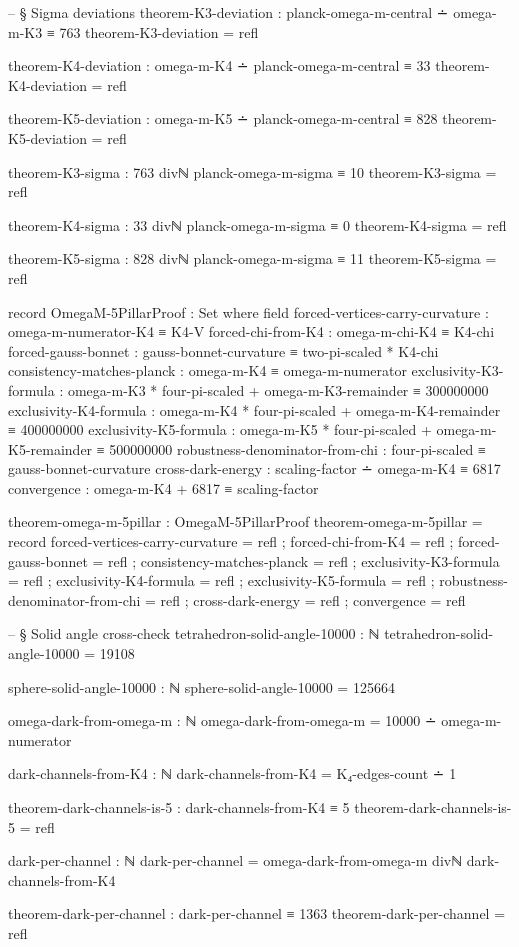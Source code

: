\documentclass[11pt,a4paper]{book}
\begin{document}
\begin{code}
-- § Sigma deviations
theorem-K3-deviation : planck-omega-m-central ∸ omega-m-K3 ≡ 763
theorem-K3-deviation = refl

theorem-K4-deviation : omega-m-K4 ∸ planck-omega-m-central ≡ 33
theorem-K4-deviation = refl

theorem-K5-deviation : omega-m-K5 ∸ planck-omega-m-central ≡ 828
theorem-K5-deviation = refl

theorem-K3-sigma : 763 divℕ planck-omega-m-sigma ≡ 10
theorem-K3-sigma = refl

theorem-K4-sigma : 33 divℕ planck-omega-m-sigma ≡ 0
theorem-K4-sigma = refl

theorem-K5-sigma : 828 divℕ planck-omega-m-sigma ≡ 11
theorem-K5-sigma = refl

record OmegaM-5PillarProof : Set where
  field
    forced-vertices-carry-curvature : omega-m-numerator-K4 ≡ K4-V
    forced-chi-from-K4 : omega-m-chi-K4 ≡ K4-chi
    forced-gauss-bonnet : gauss-bonnet-curvature ≡ two-pi-scaled * K4-chi
    consistency-matches-planck : omega-m-K4 ≡ omega-m-numerator
    exclusivity-K3-formula : omega-m-K3 * four-pi-scaled + omega-m-K3-remainder ≡ 300000000
    exclusivity-K4-formula : omega-m-K4 * four-pi-scaled + omega-m-K4-remainder ≡ 400000000
    exclusivity-K5-formula : omega-m-K5 * four-pi-scaled + omega-m-K5-remainder ≡ 500000000
    robustness-denominator-from-chi : four-pi-scaled ≡ gauss-bonnet-curvature
    cross-dark-energy : scaling-factor ∸ omega-m-K4 ≡ 6817
    convergence : omega-m-K4 + 6817 ≡ scaling-factor

theorem-omega-m-5pillar : OmegaM-5PillarProof
theorem-omega-m-5pillar = record
  { forced-vertices-carry-curvature = refl
  ; forced-chi-from-K4 = refl
  ; forced-gauss-bonnet = refl
  ; consistency-matches-planck = refl
  ; exclusivity-K3-formula = refl
  ; exclusivity-K4-formula = refl
  ; exclusivity-K5-formula = refl
  ; robustness-denominator-from-chi = refl
  ; cross-dark-energy = refl
  ; convergence = refl }

-- § Solid angle cross-check
tetrahedron-solid-angle-10000 : ℕ
tetrahedron-solid-angle-10000 = 19108

sphere-solid-angle-10000 : ℕ
sphere-solid-angle-10000 = 125664

omega-dark-from-omega-m : ℕ
omega-dark-from-omega-m = 10000 ∸ omega-m-numerator

dark-channels-from-K4 : ℕ
dark-channels-from-K4 = K₄-edges-count ∸ 1

theorem-dark-channels-is-5 : dark-channels-from-K4 ≡ 5
theorem-dark-channels-is-5 = refl

dark-per-channel : ℕ
dark-per-channel = omega-dark-from-omega-m divℕ dark-channels-from-K4

theorem-dark-per-channel : dark-per-channel ≡ 1363
theorem-dark-per-channel = refl
\end{code}
\end{document}
